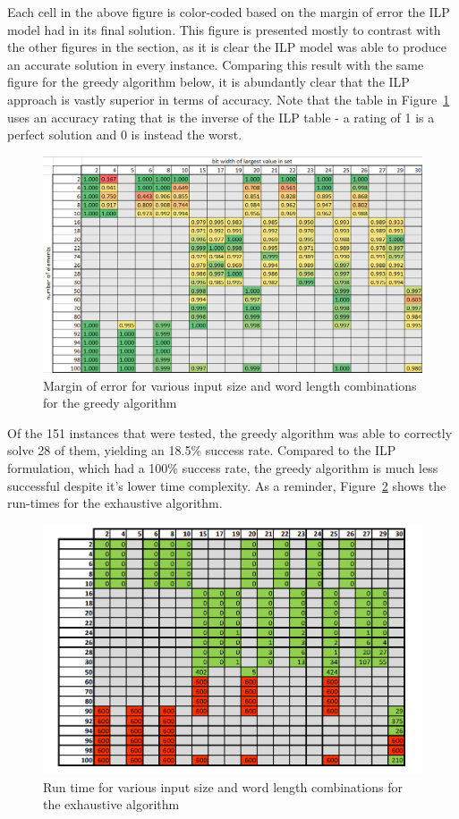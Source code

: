 \documentclass{report}
\begin{document}
Each cell in the above figure is color-coded based on the margin of error
the ILP model had in its final solution. This figure is presented mostly to
contrast with the other figures in the section, as it is clear the ILP model
was able to produce an accurate solution in every instance. Comparing this result
with the same figure for the greedy algorithm below, it is abundantly clear
that the ILP approach is vastly superior in terms of accuracy. Note that the
table in Figure~\ref{fig:greedy} uses an accuracy rating that is the inverse of the
ILP table - a rating of 1 is a perfect solution and 0 is instead the worst.

\begin{figure}[h]
\centering
\includegraphics[width=12cm]{P3_margin.png}
\caption{Margin of error for various input size and word length combinations for the greedy algorithm}
\label{fig:greedy}
\end{figure}

Of the 151 instances that were tested, the greedy algorithm was able to
correctly solve 28 of them, yielding an 18.5\% success rate. Compared to the
ILP formulation, which had a 100\% success rate, the greedy algorithm 
is much less successful despite it's lower time complexity. As a reminder,
Figure~\ref{fig:exhaustive} shows the run-times for the exhaustive algorithm.

\begin{figure}[h]
\centering
\includegraphics[width=12cm]{P1_res.png}
\caption{Run time for various input size and word length combinations for the exhaustive algorithm}
\label{fig:exhaustive}
\end{figure}
\end{document}
